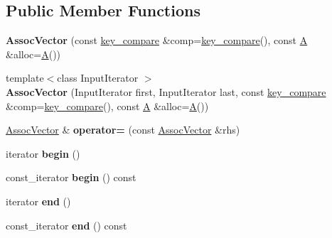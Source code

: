 \subsection*{Public Member Functions}
\begin{DoxyCompactItemize}
\item 
\hypertarget{classLoki_1_1AssocVector_a52e9076e2d09ac5ddabb58b0e3752c24}{}{\bfseries Assoc\+Vector} (const \hyperlink{classC}{key\+\_\+compare} \&comp=\hyperlink{classC}{key\+\_\+compare}(), const \hyperlink{structA}{A} \&alloc=\hyperlink{structA}{A}())\label{classLoki_1_1AssocVector_a52e9076e2d09ac5ddabb58b0e3752c24}

\item 
\hypertarget{classLoki_1_1AssocVector_a589372c4373a599c71165dd45f4d8744}{}{\footnotesize template$<$class Input\+Iterator $>$ }\\{\bfseries Assoc\+Vector} (Input\+Iterator first, Input\+Iterator last, const \hyperlink{classC}{key\+\_\+compare} \&comp=\hyperlink{classC}{key\+\_\+compare}(), const \hyperlink{structA}{A} \&alloc=\hyperlink{structA}{A}())\label{classLoki_1_1AssocVector_a589372c4373a599c71165dd45f4d8744}

\item 
\hypertarget{classLoki_1_1AssocVector_a21657406f518421d1b9ed3fc30bfa678}{}\hyperlink{classLoki_1_1AssocVector}{Assoc\+Vector} \& {\bfseries operator=} (const \hyperlink{classLoki_1_1AssocVector}{Assoc\+Vector} \&rhs)\label{classLoki_1_1AssocVector_a21657406f518421d1b9ed3fc30bfa678}

\item 
\hypertarget{classLoki_1_1AssocVector_a04bd7c45f3107a8d6e4b62f5c7ea2340}{}iterator {\bfseries begin} ()\label{classLoki_1_1AssocVector_a04bd7c45f3107a8d6e4b62f5c7ea2340}

\item 
\hypertarget{classLoki_1_1AssocVector_a606147b506f5728fd5caabd991dbed37}{}const\+\_\+iterator {\bfseries begin} () const \label{classLoki_1_1AssocVector_a606147b506f5728fd5caabd991dbed37}

\item 
\hypertarget{classLoki_1_1AssocVector_a4bee2aae5dff07e6afc8b0169adb5628}{}iterator {\bfseries end} ()\label{classLoki_1_1AssocVector_a4bee2aae5dff07e6afc8b0169adb5628}

\item 
\hypertarget{classLoki_1_1AssocVector_a1e853ad54eeb1b69de8d9c7560f678ff}{}const\+\_\+iterator {\bfseries end} () const \label{classLoki_1_1AssocVector_a1e853ad54eeb1b69de8d9c7560f678ff}


\end{DoxyCompactItemize}
